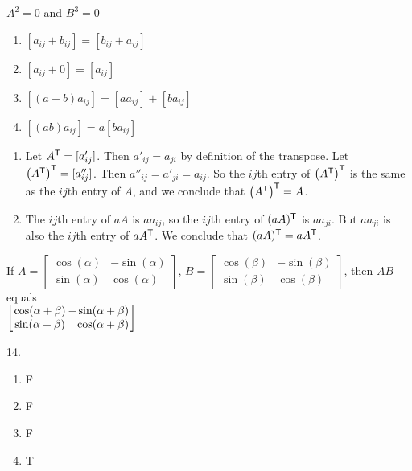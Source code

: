 \begin{multicols}{2}
\item $A^2=0$ and $B^3=0$

\item 
\begin{enumerate}[label=(\alph*), leftmargin=1\parindent]
\item $[a_{ij} + b_{ij}] = [b_{ij} + a_{ij}]$ 
\item $[a_{ij} + 0] = [a_{ij}]$
\item $[(a+b)a_{ij}] = [aa_{ij}] + [ba_{ij}]$
\item $[(ab)a_{ij}] = a[ba_{ij}]$   
\end{enumerate}

\item 
\begin{enumerate}[label=(\alph*), leftmargin=1\parindent]
\item Let $A^{\mathsf{T}} = [a'_{ij}]$. Then $a'_{ij} = a_{ji}$ by definition of the transpose. Let $\left(A^{\mathsf{T}}\right)^{\mathsf{T}} = [a''_{ij}]$. Then $a''_{ij} = a'_{ji} = a_{ij}$. So the $ij$th entry of $\left(A^{\mathsf{T}}\right)^{\mathsf{T}}$ is the same as the $ij$th entry of $A$, and we conclude that $\left(A^{\mathsf{T}}\right)^{\mathsf{T}} = A$. 
	\item The $ij$th entry of $aA$ is $aa_{ij}$, so the $ij$th entry of $(aA)^{\mathsf{T}}$ is $aa_{ji}$. But $aa_{ji}$ is also the $ij$th entry of $aA^{\mathsf{T}}$. We conclude that $(aA)^{\mathsf{T}} = aA^{\mathsf{T}}$.
	
	\end{enumerate}


\item If $A=\left[ \begin{array}{cr} \cos(\alpha) & -\sin(\alpha) \\ \sin(\alpha) & \cos(\alpha) \end{array} \right]$, $B =  \left[ \begin{array}{cr} \cos(\beta) & -\sin(\beta) \\ \sin(\beta) & \cos(\beta) \end{array} \right]$, then  $AB$ equals \\
$\left[ \arraycolsep=1.0pt \begin{array}{cr} \cos(\alpha+\beta) & -\sin(\alpha+\beta) \\ \sin(\alpha+\beta) & \cos(\alpha+\beta) \end{array} \right]$

\oee

\be	
\item[14.] 
\begin{enumerate}[label=(\alph*), leftmargin=1\parindent]
\item  F
\item F
\item F
\item T
\end{enumerate}


\end{multicols}

